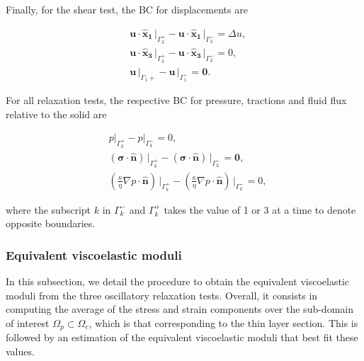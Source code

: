 \documentclass[draft]{agujournal2019}
\begin{document}
Finally, for the shear test, the BC for displacements are
\begin{linenomath*}
\begin{equation}\label{Eq.10}
\begin{split}
& \bm{u} \cdot \bm{\hat{x}_1}\,\vert_{\Gamma_3^+}- \bm{u} \cdot \bm{\hat{x}_1} \,\vert_{\Gamma_3^-} =\Delta u,\\
& \bm{u} \cdot \bm{\hat{x}_3}\,\vert_{\Gamma_3^+}- \bm{u} \cdot \bm{\hat{x}_3}\,\vert_{\Gamma_3^-} = 0, \\
& \bm{u}\,\vert_{\Gamma_1+}- \bm{u}\,\vert_{\Gamma_1^-} =\bm{0}.
\end{split}
\end{equation}
\end{linenomath*}

For all relaxation tests, the respective BC for pressure, tractions and fluid flux relative to the solid are
\begin{linenomath*}
\begin{equation}\label{Eq.11}
\begin{split}
& p\vert_{\Gamma_k^+}-p\vert_{\Gamma_k^-} =0, \\
& \left(\bm{\sigma}\cdot \bm{\hat n} \right)\, \vert_{\Gamma_k^+}-\left(\bm{\sigma}\cdot \bm{\hat n} \right)\, \vert_{\Gamma_k^-} = \bm{0},\\
&\left( \frac{\kappa}{\eta} \nabla p \cdot \bm{\hat n} \right) \, \vert_{\Gamma_k^+} -\left( \frac{\kappa}{\eta} \nabla p \cdot \bm{\hat n} \right) \, \vert_{\Gamma_k^-} = 0,
\end{split}
\end{equation}
\end{linenomath*}
where the subscript $k$ in $\Gamma_k^-$ and $\Gamma_k^+$ takes the value of 1 or 3 at a time to denote opposite boundaries.

\subsubsection{Equivalent viscoelastic moduli}
In this subsection, we detail the procedure to obtain the equivalent viscoelastic moduli from the three oscillatory relaxation tests. Overall, it consists in computing the average of the  stress and strain components over the sub-domain of interest $\Omega_p \subset \Omega_e$, which is that corresponding to the thin layer section. This is followed by an estimation of the equivalent viscoelastic moduli that best fit these values. 
\end{document}
